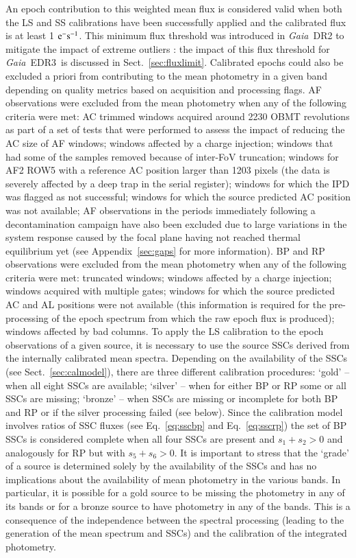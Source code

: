 \documentclass{aa}
\newcommand{\gaia}{\textit{Gaia}\xspace}
\newcommand{\drt}{\gaia~DR2\xspace}
\newcommand{\edr}{\gaia~EDR3\xspace}
\newcommand{\secname}{Sect.}
\newcommand{\equref}[1]{Eq.~\ref{eq:#1}}
\newcommand{\secref}[1]{\secname~\ref{sec:#1}}
\newcommand{\appref}[1]{Appendix~\ref{sec:#1}}
\begin{document}
An epoch contribution to this weighted mean flux is considered valid when both the LS and SS calibrations have been successfully applied and the calibrated flux is at least 1 ${\rm e}^-{\rm s}^{-1}$. This minimum flux threshold was introduced in \drt to mitigate the impact of extreme outliers \citep{Proc_DR2}: the impact of this flux threshold for \edr\ is discussed in \secref{fluxlimit}. Calibrated epochs could also be excluded a priori from contributing to the mean photometry in a given band depending on quality metrics based on acquisition and processing flags. AF observations were excluded from the mean photometry when any of the following criteria were met: AC trimmed windows acquired around 2230 OBMT revolutions as part of a set of tests that were performed to assess the impact of reducing the AC size of AF windows; windows affected by a charge injection; windows that had some of the samples removed because of inter-FoV truncation; windows for AF2 ROW5 with a reference AC position larger than 1203 pixels (the data is severely affected by a deep trap in the serial register); windows for which the IPD was flagged as not successful; windows for which the source predicted AC position was not available; AF observations in the periods immediately following a decontamination campaign have also been excluded due to large variations in the system response caused by the focal plane having not reached thermal equilibrium yet (see \appref{gaps} for more information).
%
BP and RP observations were excluded from the mean photometry when any of the following criteria were met: truncated windows; windows affected by a charge injection; windows acquired with multiple gates; windows for which the source predicted AC and AL positions were not available (this information is required for the pre-processing of the epoch spectrum from which the raw epoch flux is produced); windows affected by bad columns.
%
To apply the LS calibration to the epoch observations of a given source, it is necessary to use the source SSCs derived from the internally calibrated mean spectra. Depending on the availability of the SSCs (see \secref{calmodel}), there are three different calibration procedures: `gold' -- when all eight SSCs are available; `silver' -- when for either BP or RP some or all SSCs are missing; `bronze' -- when SSCs are missing or incomplete for both BP and RP or if the silver processing failed (see below). Since the calibration model involves ratios of SSC fluxes (see \equref{sscbp} and \equref{sscrp}) the set of BP SSCs is considered complete when all four SSCs are present and $s_1+s_2>0$ and analogously for RP but with $s_5+s_6>0$.
It is important to stress that the `grade' of a source is determined solely by the availability of the SSCs and has no implications about the availability of mean photometry in the various bands. In particular, it is possible for a gold source to be missing the photometry in any of its bands or for a bronze source to have photometry in any of the bands. This is a consequence of the independence between the spectral processing (leading to the generation of the mean spectrum and SSCs) and the calibration of the integrated photometry.
\end{document}

